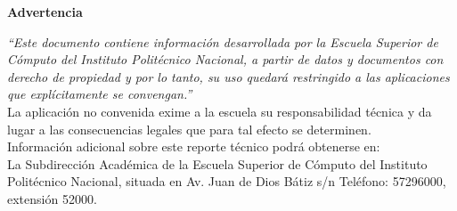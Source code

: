 
\begin{small}
	
	\centering \textbf{Advertencia} 
	
\end{small}


	\textit{“Este documento contiene información desarrollada por la Escuela
		Superior de Cómputo del Instituto Politécnico Nacional, a partir de datos y
		documentos con derecho de propiedad y por lo tanto, su uso quedará
		restringido a las aplicaciones que explícitamente se convengan.”} \\
	
		La aplicación no convenida exime a la escuela su responsabilidad técnica y
		da lugar a las consecuencias legales que para tal efecto se determinen. \\
		
		Información adicional sobre este reporte técnico podrá obtenerse en: \\
		
		La Subdirección Académica de la Escuela Superior de Cómputo del Instituto
		Politécnico Nacional, situada en Av. Juan de Dios Bátiz s/n Teléfono:
		57296000, extensión 52000.
		






		